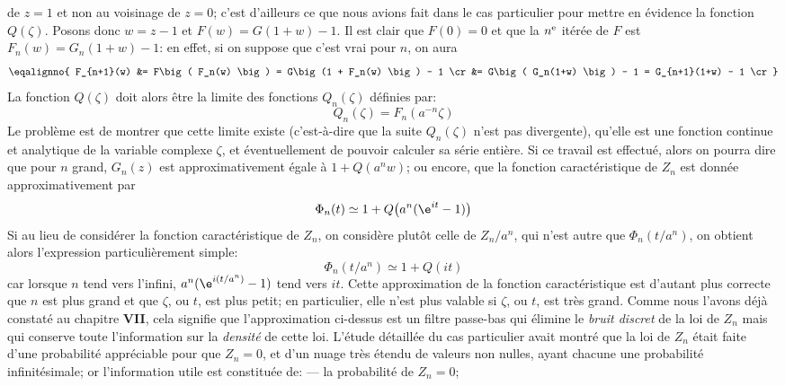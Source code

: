 de $z=1$ et non au voisinage de $z=0$;  c'est d'ailleurs ce que nous avions
fait dans le cas particulier pour mettre en \'evidence la fonction $Q(\zeta)$. 
\medskip
Posons donc $w = z - 1$ et $F(w) = G(1+w) - 1$. Il est clair que $F(0) = 
0$ et que la $n^{\rm e}$ it\'er\'ee de $F$ est $F_n(w) = G_n(1+w) - 1$: 
en  effet, si on suppose que c'est vrai pour $n$, on aura
$$\eqalignno{
F_{n+1}(w) &= F\big( F_n(w) \big) = G\big(1 + F_n(w) \big) - 1 \cr
&= G\big( G_n(1+w) \big) - 1 = G_{n+1}(1+w) - 1 \cr }$$
La fonction $Q(\zeta )$ doit alors \^etre la limite des fonctions
$Q_n(\zeta )$ d\'efinies par:
$$Q_n(\zeta ) = F_n(a^{-n}\zeta )$$
Le probl\`eme est de montrer que cette limite existe (c'est-\`a-dire
que la suite $Q_n(\zeta )$ n'est pas divergente), qu'elle est une
fonction continue et analytique de la variable complexe $\zeta$, et
\'eventuellement de pouvoir calculer sa s\'erie enti\`ere. Si ce travail 
est effectu\'e, alors on pourra dire que pour $n$ grand, $G_n(z)$ est
approximativement \'egale \`a $1 + Q(a^n w)$; ou encore, que la fonction
caract\'eristique de $Z_n$ est donn\'ee approximativement par
$$\Phi_n(t) \simeq 1 + Q\big( a^n (\e^{it}-1) \big)$$
Si au lieu de consid\'erer la fonction caract\'eristique de $Z_n$, on
consid\`ere plut\^ot celle de $Z_n / a^n$, qui n'est autre que
$\Phi_n(t/a^n)$, on obtient alors l'expression particuli\`erement simple:
$$\Phi_n(t/a^n) \simeq 1 + Q(it)$$
car lorsque $n$ tend vers l'infini, $a^n(\e^{i(t/a^n)}-1)$ tend vers $it$.
\medskip
Cette approximation de la fonction caract\'eristique est d'autant plus
correcte que $n$ est plus grand et que $\zeta$, ou $t$, est plus petit;
en particulier, elle n'est plus valable si $\zeta$, ou $t$, est tr\`es grand.
Comme nous l'avons d\'ej\`a constat\'e au chapitre {\bf VII}, cela 
signifie que l'approximation ci-dessus est un filtre passe-bas qui
\'elimine le {\it bruit discret} de la loi de $Z_n$ mais qui conserve 
toute l'information sur la {\it densit\'e} de cette loi. L'\'etude
d\'etaill\'ee du cas particulier avait montr\'e que la loi de $Z_n$
\'etait faite
d'une probabilit\'e appr\'eciable pour que $Z_n=0$, et d'un nuage tr\`es \'etendu de valeurs non nulles,  ayant chacune une
probabilit\'e
infinit\'esimale;  or l'information  utile est constitu\'ee de:
\smallskip
--- la probabilit\'e de $Z_n = 0$;

